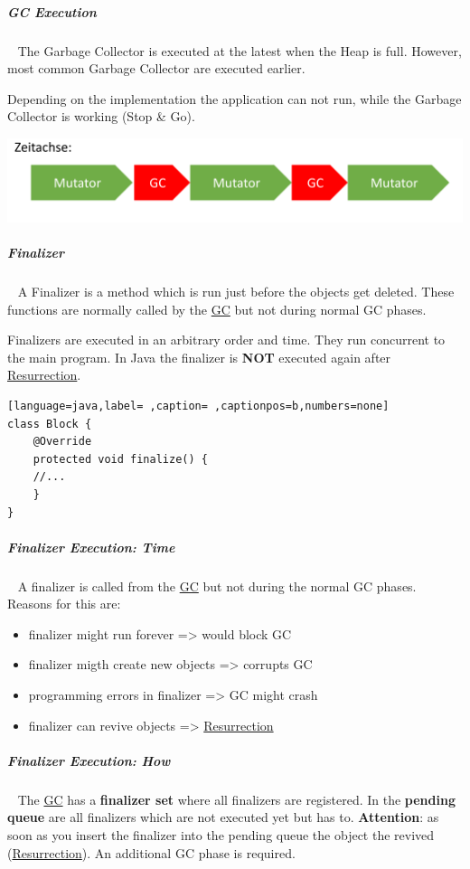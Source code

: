 \documentclass[11pt,twoside,landscape]{article}
\begin{document}
\begin{multicols}{3}
\subparagraph{GC Execution} \
\label{sec:org070d29a}
The Garbage Collector is executed at the latest when the Heap is full.
However, most common Garbage Collector are executed earlier.

Depending on the implementation the application can not run, while the Garbage Collector is working (Stop \& Go).


{
\begin{center}
\includegraphics[width=.9\linewidth]{img/stop_and_go_gc.png}
\end{center}
\label{fig:stop-go-gc}
}

\subparagraph{Finalizer} \
\label{sec:org96919c4}
A Finalizer is a method which is run just before the objects get deleted.
These functions are normally called by the \href{../../../roam/20211008083744-garbage_collection.org}{GC} but not during normal GC phases.

Finalizers are executed in an arbitrary order and time.
They run concurrent to the main program.
In Java the finalizer is \textbf{NOT} executed again after \href{../../../roam/20221231095240-what_is_resurrection.org}{Resurrection}.

\begin{lstlisting}[language=java,label= ,caption= ,captionpos=b,numbers=none]
class Block {
    @Override
    protected void finalize() {
	//...
    }
}
\end{lstlisting}
\subparagraph{Finalizer Execution: Time} \
\label{sec:orge87ac41}
A finalizer is called from the \href{../../../roam/20211008083744-garbage_collection.org}{GC} but not during the normal GC phases. 
Reasons for this are:
\begin{itemize}
\item finalizer might run forever => would block GC
\item finalizer migth create new objects => corrupts GC
\item programming errors in finalizer => GC might crash
\item finalizer can revive objects => \href{../../../roam/20221231095240-what_is_resurrection.org}{Resurrection}
\end{itemize}
\subparagraph{Finalizer Execution: How} \
\label{sec:org8201c11}
The \href{../../../roam/20211008083744-garbage_collection.org}{GC} has a \textbf{finalizer set} where all finalizers are registered.
In the \textbf{pending queue} are all finalizers which are not executed yet but has to.
\textbf{Attention}: as soon as you insert the finalizer into the pending queue the object the revived (\href{../../../roam/20221231095240-what_is_resurrection.org}{Resurrection}).
An additional GC phase is required.



\end{multicols}
\end{document}
